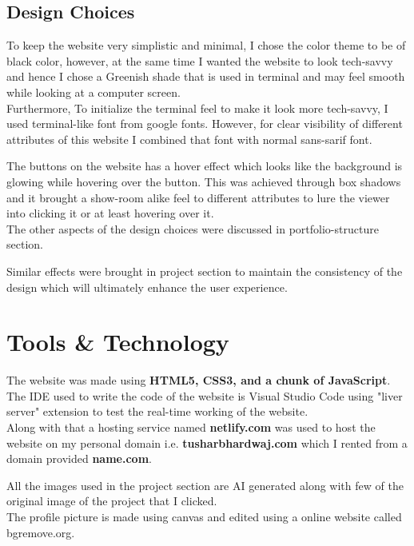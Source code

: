 \documentclass{report}
\begin{document}
\section{Design Choices}
To keep the website very simplistic and minimal, I chose the color theme to be of black color, however, at the same time I wanted the website to look tech-savvy and hence I chose a Greenish shade that is used in terminal and may feel smooth while looking at a computer screen. \\
Furthermore, To initialize the terminal feel to make it look more tech-savvy, I used terminal-like font from google fonts. However, for clear visibility of different attributes of this website I combined that font with normal sans-sarif font.\\
\par
The buttons on the website has a hover effect which looks like the background is glowing while hovering over the button. This was achieved through box shadows and it brought a show-room alike feel to different attributes to lure the viewer into clicking it or at least hovering over it.
\\ The other aspects of the design choices were discussed in portfolio-structure section.\par
Similar effects were brought in project section to maintain the consistency of the design which will ultimately enhance the user experience. 

\chapter{Tools \& Technology}
The website was made using {\bf HTML5, CSS3, and a chunk of JavaScript}. The IDE used to write the code of the website is Visual Studio Code using "liver server" extension to test the real-time working of the website.\\ Along with that a hosting service named {\bf netlify.com} was used to host the website on my personal domain i.e. {\bf tusharbhardwaj.com} which I rented from a domain provided {\bf name.com}.\\ \par
All the images used in the project section are AI generated along with few of the original image of the project that I clicked.\\ The profile picture is made using canvas and edited using a online website called {\bg bgremove.org}. \\ \par
\end{document}
